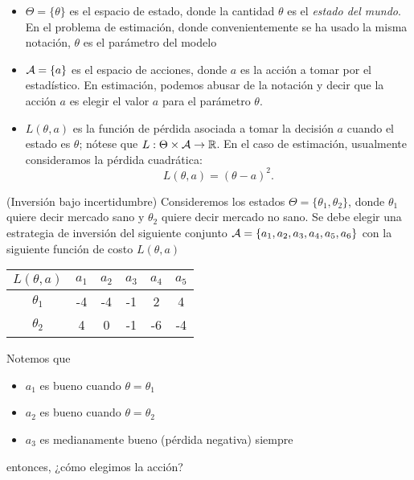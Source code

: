 \begin{itemize}
	\item $\Theta = \{\theta\}$ es el espacio de estado, donde la cantidad $\theta$ es el \textit{estado del mundo}. En el problema de estimación, donde convenientemente se ha usado la misma notación, $\theta$ es el parámetro del modelo
	\item ${\mathcal A}=\{a\}$ es el espacio de acciones, donde $a$ es la acción a tomar por el estadístico. En estimación, podemos abusar de la notación y decir que la acción $a$ es elegir el valor $a$ para el parámetro $\theta$. 
	\item $L(\theta,a)$ es la función de pérdida asociada a tomar la decisión $a$ cuando el estado es $\theta$; nótese que $L:\Theta\times{\mathcal A}\rightarrow{\mathbb R}$. En el caso de estimación, usualmente consideramos la pérdida cuadrática:
	\begin{equation}
		L(\theta,a) = (\theta-a)^2.
	\end{equation}
\end{itemize}

\begin{example}(Inversión bajo incertidumbre)
	Consideremos los estados $\Theta = \{\theta_1,\theta_2\}$, donde $\theta_1$ quiere decir mercado sano y $\theta_2$ quiere decir mercado no sano. Se debe elegir una estrategia de inversión del siguiente conjunto ${\mathcal A}=\{a_1,a_2,a_3,a_4,a_5,a_6\}$ con la siguiente función de costo $L(\theta,a)$
	\begin{table}[h]
		\centering
		\begin{tabular}{c|ccccc}
			$L(\theta,a)$   & $a_1$ & $a_2$ & $a_3$ & $a_4$ & $a_5$ \\
			\hline
			$\theta_1$ & -4   & -4   & -1   & 2    & 4    \\
			$\theta_2$  & 4    & 0    & -1   & -6   & -4
		\end{tabular}
	\end{table} 
	Notemos que \begin{itemize}
		\item $a_1$ es bueno  cuando $\theta=\theta_1$
		\item $a_2$ es bueno cuando $\theta=\theta_2$
		\item $a_3$ es medianamente bueno (pérdida negativa) siempre
	\end{itemize}
	entonces, ¿cómo elegimos la acción?
\end{example}

